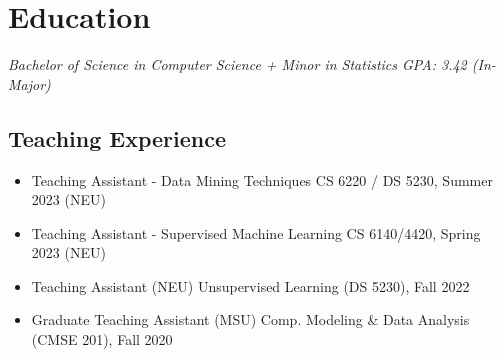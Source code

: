 \documentclass[11pt,a4paper,sans]{moderncv} %
\begin{document}


%
%
%
%
%


\makecvtitle %
\vspace{-1.5em}

\section{Education}
{\em \normalsize Bachelor of Science in Computer Science + Minor in Statistics \hfill GPA: 3.42 (In-Major)} 

\subsection{Teaching Experience}
\begin{itemize}
\setlength\itemsep{-0.5em}	
\item Teaching Assistant - Data Mining Techniques \hfill CS 6220 / DS 5230, Summer 2023 (NEU)
\item Teaching Assistant - Supervised Machine Learning \hfill CS 6140/4420, Spring 2023 (NEU)
\item Teaching Assistant (NEU) \hfill  Unsupervised Learning (DS 5230), Fall 2022
\item Graduate Teaching Assistant (MSU) \hfill Comp. Modeling \& Data Analysis (CMSE 201), Fall 2020
\end{itemize}
 
\end{document}
